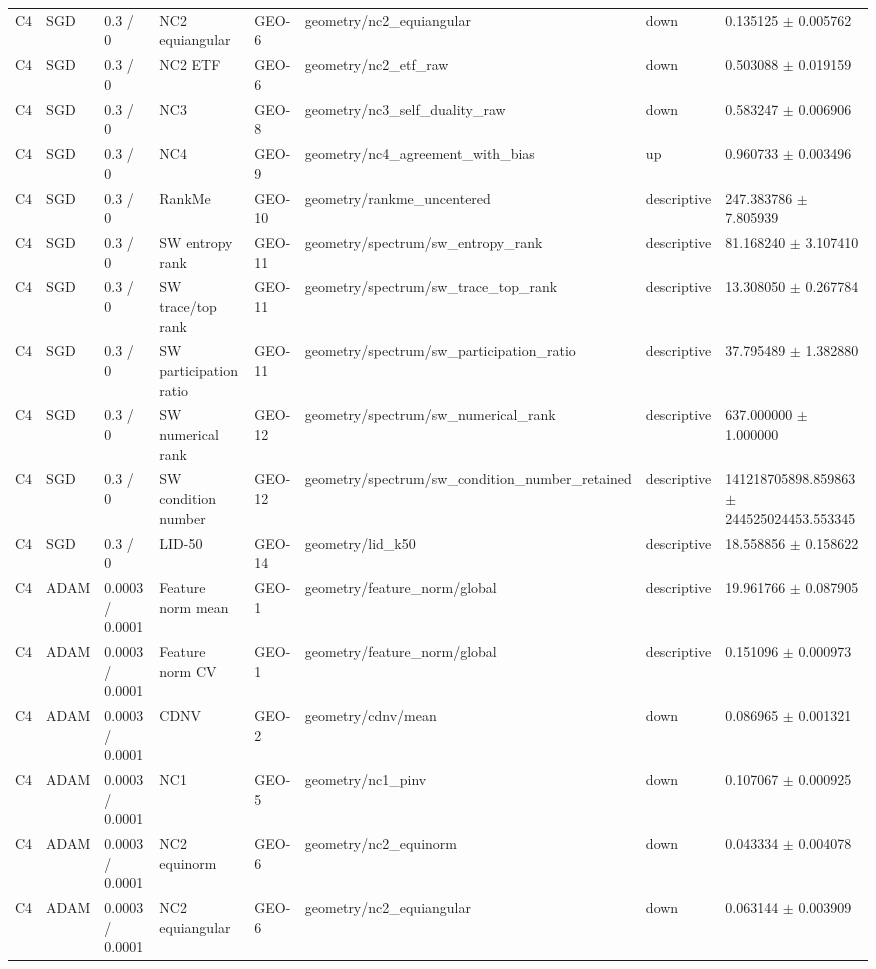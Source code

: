 \begin{longtable}{llllllll}
C4 & SGD & 0.3 / 0 & NC2 equiangular & GEO-6 & geometry/nc2\_equiangular & down & 0.135125 $\pm$ 0.005762 \\
C4 & SGD & 0.3 / 0 & NC2 ETF & GEO-6 & geometry/nc2\_etf\_raw & down & 0.503088 $\pm$ 0.019159 \\
C4 & SGD & 0.3 / 0 & NC3 & GEO-8 & geometry/nc3\_self\_duality\_raw & down & 0.583247 $\pm$ 0.006906 \\
C4 & SGD & 0.3 / 0 & NC4 & GEO-9 & geometry/nc4\_agreement\_with\_bias & up & 0.960733 $\pm$ 0.003496 \\
C4 & SGD & 0.3 / 0 & RankMe & GEO-10 & geometry/rankme\_uncentered & descriptive & 247.383786 $\pm$ 7.805939 \\
C4 & SGD & 0.3 / 0 & SW entropy rank & GEO-11 & geometry/spectrum/sw\_entropy\_rank & descriptive & 81.168240 $\pm$ 3.107410 \\
C4 & SGD & 0.3 / 0 & SW trace/top rank & GEO-11 & geometry/spectrum/sw\_trace\_top\_rank & descriptive & 13.308050 $\pm$ 0.267784 \\
C4 & SGD & 0.3 / 0 & SW participation ratio & GEO-11 & geometry/spectrum/sw\_participation\_ratio & descriptive & 37.795489 $\pm$ 1.382880 \\
C4 & SGD & 0.3 / 0 & SW numerical rank & GEO-12 & geometry/spectrum/sw\_numerical\_rank & descriptive & 637.000000 $\pm$ 1.000000 \\
C4 & SGD & 0.3 / 0 & SW condition number & GEO-12 & geometry/spectrum/sw\_condition\_number\_retained & descriptive & 141218705898.859863 $\pm$ 244525024453.553345 \\
C4 & SGD & 0.3 / 0 & LID-50 & GEO-14 & geometry/lid\_k50 & descriptive & 18.558856 $\pm$ 0.158622 \\
C4 & ADAM & 0.0003 / 0.0001 & Feature norm mean & GEO-1 & geometry/feature\_norm/global & descriptive & 19.961766 $\pm$ 0.087905 \\
C4 & ADAM & 0.0003 / 0.0001 & Feature norm CV & GEO-1 & geometry/feature\_norm/global & descriptive & 0.151096 $\pm$ 0.000973 \\
C4 & ADAM & 0.0003 / 0.0001 & CDNV & GEO-2 & geometry/cdnv/mean & down & 0.086965 $\pm$ 0.001321 \\
C4 & ADAM & 0.0003 / 0.0001 & NC1 & GEO-5 & geometry/nc1\_pinv & down & 0.107067 $\pm$ 0.000925 \\
C4 & ADAM & 0.0003 / 0.0001 & NC2 equinorm & GEO-6 & geometry/nc2\_equinorm & down & 0.043334 $\pm$ 0.004078 \\
C4 & ADAM & 0.0003 / 0.0001 & NC2 equiangular & GEO-6 & geometry/nc2\_equiangular & down & 0.063144 $\pm$ 0.003909 \\

\end{longtable}
